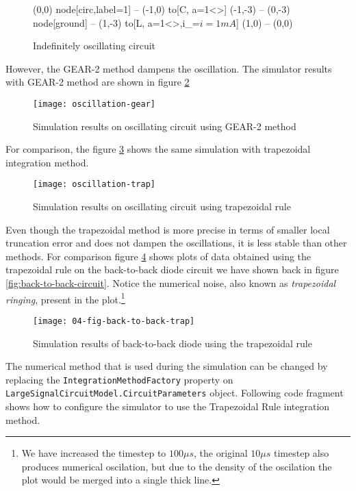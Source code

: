 \begin{figure}[h]
	\centering
	\begin{circuitdev}
		(0,0) node[circ,label=1]{} -- (-1,0) to[C, a=1<\nano\farad>] (-1,-3) -- (0,-3) node[ground]{} -- (1,-3)  to[L, a=1<\micro\henry>,i_=\mbox{$i=1mA$}] (1,0) -- (0,0)
	\end{circuitdev}
	\caption{Indefinitely oscillating circuit}
	\label{fig:oscillation-circuit}
\end{figure}

However, the GEAR-2 method dampens the oscillation. The simulator results with GEAR-2 method are shown in figure \ref{fig:oscillation-gear}

\begin{figure}[H]
	\centering
	\texttt{[image: oscillation-gear]}
	\caption{Simulation results on oscillating circuit using GEAR-2 method}
	\label{fig:oscillation-gear}
\end{figure}

For comparison, the figure \ref{fig:oscillation-trap} shows the same simulation with trapezoidal integration method.

\begin{figure}[h]
	\centering
	\texttt{[image: oscillation-trap]}
	\caption{Simulation results on oscillating circuit using trapezoidal rule}
	\label{fig:oscillation-trap}
\end{figure}

Even though the trapezoidal method is more precise in terms of smaller local truncation error and does not dampen the oscillations, it is less stable than other methods. For comparison figure \ref{fig:04-fig-back-to-back-trap} shows plots of data obtained using the trapezoidal rule on the back-to-back diode circuit we have shown back in figure \ref{fig:back-to-back-circuit}. Notice the numerical noise, also known as \textit{trapezoidal ringing}, present in the plot.\footnote{We have increased the timestep to $100\mu{}s$, the original $10\mu{}s$ timestep also produces numerical oscilation, but due to the density of the oscilation the plot would be merged into a single thick line.}

\begin{figure}[h]
	\centering
	\texttt{[image: 04-fig-back-to-back-trap]}
	\caption{Simulation results of back-to-back diode using the trapezoidal rule}
	\label{fig:04-fig-back-to-back-trap}
\end{figure}

The numerical method that is used during the simulation can be changed by replacing the \texttt{IntegrationMethodFactory} property on \texttt{LargeSignalCircuit\+Model.CircuitParameters} object. Following code fragment shows how to configure the simulator to use the Trapezoidal Rule integration method.

